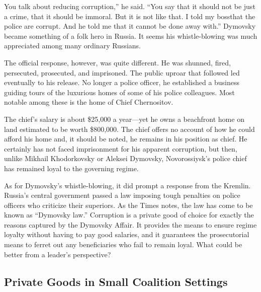 \documentclass[10pt]{article}
\begin{document}
{\large You talk about reducing corruption,'' he said. ``You say that it should
not be just a crime, that it should be immoral. But it is not like that. I told
my bossthat the police are corrupt. And he told me that it cannot be done away
with.'' Dymovsky became something of a folk hero in Russia. It seems his
whistle-blowing was much appreciated among many ordinary Russians.}

{\large The official response, however, was quite different. He was shunned,
fired, persecuted, prosecuted, and imprisoned. The public uproar that followed
led eventually to his release. No longer a police officer, he established a
business guiding tours of the luxurious homes of some of his police colleagues.
Most notable among these is the home of Chief Chernositov.}

{\large The chief's salary is about \$25,000 a year---yet he owns a beachfront
home on land estimated to be worth \$800,000. The chief offers no account of how
he could afford his home and, it should be noted, he remains in his position as
chief. He certainly has not faced imprisonment for his apparent corruption, but
then, unlike Mikhail Khodorkovsky or Aleksei Dymovsky, Novorossiysk's police
chief has remained loyal to the governing regime.}

{\large As for Dymovsky's whistle-blowing, it did prompt a response from the
Kremlin. Russia's central government passed a law imposing tough penalties on
police officers who criticize their superiors. As the Times notes, the law has
come to be known as ``Dymovsky law.'' Corruption is a private good of choice for
exactly the reasons captured by the Dymovsky Affair. It provides the means to
ensure regime loyalty without having to pay good salaries, and it guarantees the
prosecutorial means to ferret out any beneficiaries who fail to remain loyal.
What could be better from a leader's perspective?}

\subsection{Private Goods in Small Coalition Settings}
\end{document}
